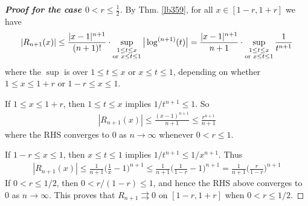 \documentclass[12pt,b5paper,notitlepage]{article}
\theoremstyle{definition}
\theoremstyle{plain}
\numberwithin{equation}{section}
\begin{document}
\begin{proof}[\textbf{Proof for the case $0<r\leq \frac 12$}]
By Thm. \ref{lb359}, for all $x\in[1-r,1+r]$ we have
\begin{align*}
|R_{n+1}(x)|\leq \frac{|x-1|^{n+1}}{(n+1)!}\cdot\sup_{
\begin{subarray}{c}
1\leq t\leq x\\
\text{or }x\leq t\leq 1
\end{subarray}
}
\big|\log^{(n+1)}(t)\big|=\frac{|x-1|^{n+1}}{n+1}\cdot\sup_{
\begin{subarray}{c}
1\leq t\leq x\\
\text{or }x\leq t\leq 1
\end{subarray}
}\frac 1{t^{n+1}}
\end{align*}
where the $\sup$ is over $1\leq t\leq x$ or $x\leq t\leq 1$, depending on whether $1\leq x\leq 1+r$ or $1-r\leq x\leq 1$.

If $1\leq x\leq 1+r$, then $1\leq t\leq x$ implies $1/t^{n+1}\leq 1$. So
\begin{align*}
|R_{n+1}(x)|\leq\frac{(x-1)^{n+1}}{n+1}\leq\frac{r^{n+1}}{n+1} 
\end{align*}
where the RHS converges to $0$ as $n\rightarrow\infty$ whenever $0<r\leq 1$. 

If $1-r\leq x\leq 1$, then $x\leq t\leq 1$ implies $1/t^{n+1}\leq 1/x^{n+1}$. Thus
\begin{align*}
|R_{n+1}(x)|\leq\frac 1{n+1}\Big(\frac 1x-1 \Big)^{n+1}\leq \frac 1{n+1}\Big(\frac 1{1-r}-1 \Big)^{n+1}=\frac 1{n+1}\Big(\frac r{1-r}\Big)^{n+1}
\end{align*}
If $0<r\leq 1/2$, then $0<r/(1-r)\leq 1$, and hence the RHS above converges to $0$ as $n\rightarrow\infty$. This proves that $R_{n+1}\rightrightarrows0$ on $[1-r,1+r]$ when $0<r\leq1/2$.
\end{proof}
\end{document}
